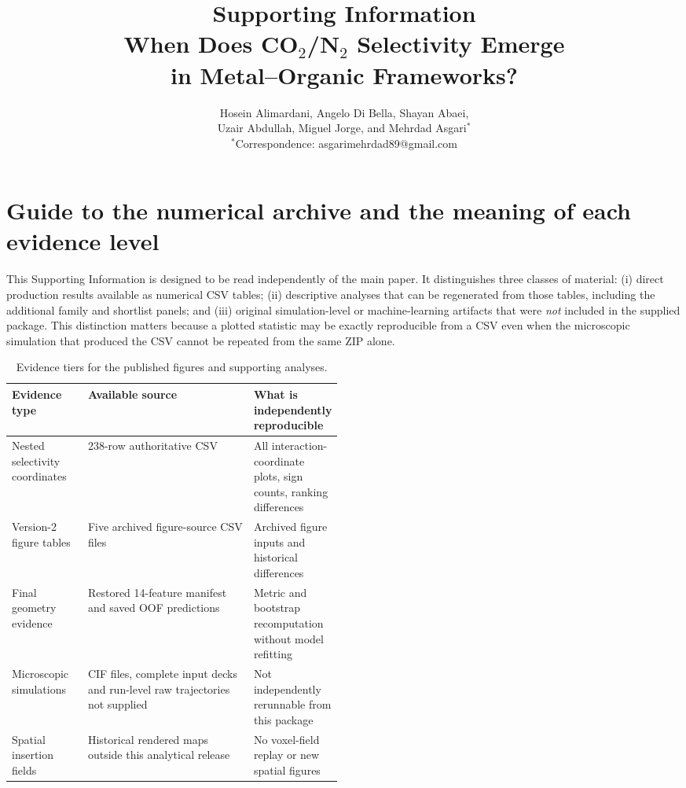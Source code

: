 \documentclass[11pt,a4paper]{article}
\title{Supporting Information\\[5pt]When Does CO$_2$/N$_2$ Selectivity Emerge\\in Metal--Organic Frameworks?}
\author{Hosein Alimardani, Angelo Di Bella, Shayan Abaei,\\[2pt]Uzair Abdullah, Miguel Jorge, and Mehrdad Asgari$^{*}$\\[3pt]
\small $^{*}$Correspondence: asgarimehrdad89@gmail.com}
\date{}
\begin{document}
\maketitle
\tableofcontents


\section{Guide to the numerical archive and the meaning of each evidence level}

This Supporting Information is designed to be read independently of the main paper. It distinguishes three classes of material: (i) direct production results available as numerical CSV tables; (ii) descriptive analyses that can be regenerated from those tables, including the additional family and shortlist panels; and (iii) original simulation-level or machine-learning artifacts that were \emph{not} included in the supplied package. This distinction matters because a plotted statistic may be exactly reproducible from a CSV even when the microscopic simulation that produced the CSV cannot be repeated from the same ZIP alone.

\begin{table}[H]\centering\small
\caption{Evidence tiers for the published figures and supporting analyses.}\begin{tabularx}{\linewidth}{p{0.23\linewidth}X p{0.26\linewidth}}\toprule
Evidence type & Available source & What is independently reproducible\\\midrule
Nested selectivity coordinates & 238-row authoritative CSV & All interaction-coordinate plots, sign counts, ranking differences\\
Version-2 figure tables & Five archived figure-source CSV files & Archived figure inputs and historical differences\\
Final geometry evidence & Restored 14-feature manifest and saved OOF predictions & Metric and bootstrap recomputation without model refitting\\
Microscopic simulations & CIF files, complete input decks and run-level raw trajectories not supplied & Not independently rerunnable from this package\\
Spatial insertion fields & Historical rendered maps outside this analytical release & No voxel-field replay or new spatial figures\\\bottomrule\end{tabularx}\end{table}
\end{document}
